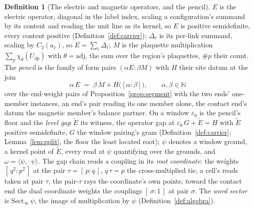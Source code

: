 \documentclass[11pt]{article}
\theoremstyle{definition}
\newtheorem{definition}{Definition}
\begin{document}
\begin{definition}[The electric and magnetic operators, and the pencil]
\label{def:pencil}
$E$ is the electric operator, diagonal in the label index, scaling
a configuration's summand by its content and reading the unit line
as its kernel, so $E$ is positive semidefinite, every content positive
(Definition~\ref{def:carrier});
$\Delta_\ell$ is its per-link summand, scaling by $C_2(a_\ell)$, so
$E=\sum_\ell\Delta_\ell$; $M$ is the plaquette multiplication
$\sum_p\chi_\theta(U_{\partial p})$ with $\theta=\mathrm{adj}$, the sum over
the region's plaquettes, $\#p$ their count. The \emph{pencil} is the family
of form pairs $(\alpha E:\beta M)$ with $H$ their site datum at the
join
\[
\alpha\,E\;=\;\beta\,M+H\big([\alpha\!:\!\beta]\big) ,\qquad
\alpha,\beta\in\mathbb N
\]
over the end-weight pairs of
Proposition~\ref{prop:segment} with the two ends' one-member
instances, an end's pair reading its one member alone, the contact
end's datum the magnetic member's balance partner. On a window $\varepsilon_0$ is the
pencil's floor and the \emph{level gap} $\tilde E$ its witness, the
operator gap at $\varepsilon_0\,G+\tilde E=H$ with $\tilde E$
positive semidefinite,
$G$ the window pairing's gram (Definition~\ref{def:carrier};
Lemma~\ref{lem:split}, the floor the least located root);
$\psi$ denotes a window ground, a kernel point of
$\tilde E$, every read at $\psi$ quantifying over the grounds, and
$\omega=\langle\psi,\cdot\,\psi\rangle$. The gap chain reads a
coupling in its \emph{root coordinate}: the weights
$[\,q^2:p^2\,]$ at the pair $\tau=[\,p:q\,]$, $q\,\tau=p$ the
cross-multiplied tie, a cell's reads taken at pair $\tau$, the
pair-$\tau$ rays the coordinate's own points; toward the contact end the dual coordinate weights the couplings
$[\,\sigma:1\,]$ at pair $\sigma$. The \emph{word sector} is
$\mathrm{Sect}_\infty\,\psi$, the image of multiplication by $\psi$
(Definition~\ref{def:algebra}).
\end{definition}
\end{document}
